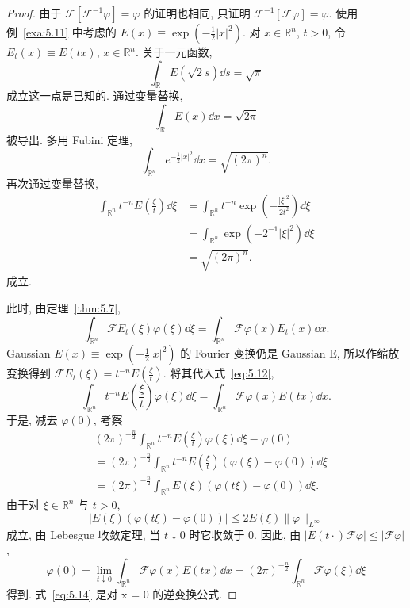 \begin{proof}
由于 $\mathcal{F}[\mathcal{F}^{-1}\varphi] = \varphi$ 的证明也相同, 只证明 $\mathcal{F}^{-1}[\mathcal{F}\varphi] = \varphi$. 使用例~\ref{exa:5.11} 中考虑的 $E(x) \equiv \exp\left(-\frac{1}{2}|x|^{2}\right)$. 对 $x \in \mathbb{R}^{n}$, $t > 0$, 令 $E_{t}(x) \equiv E(tx)$, $x \in \mathbb{R}^{n}$. 关于一元函数,
\[
\int_{\mathbb{R}}E(\sqrt{2}s)\dd s = \sqrt{\pi}
\]
成立这一点是已知的. 通过变量替换,
\[
\int_{\mathbb{R}}E(x)\dd x = \sqrt{2\pi}
\]
被导出. 多用 Fubini 定理,
\[
\int_{\mathbb{R}^{n}}e^{-\frac{1}{2}|x|^{2}}\dd x = \sqrt{(2\pi)^{n}}.
\]
再次通过变量替换,
\begin{align}
\int_{\mathbb{R}^{n}}t^{-n}E\left(\frac{\xi}{t}\right)\dd \xi &= \int_{\mathbb{R}^{n}}t^{-n}\exp\left(-\frac{|\xi|^{2}}{2t^{2}}\right)\dd \xi \nonumber \\
&= \int_{\mathbb{R}^{n}}\exp\left(-2^{-1}|\xi|^{2}\right)\dd \xi \nonumber \\
&= \sqrt{(2\pi)^{n}}. \tag{5.11}
\label{eq:5.11}
\end{align}
成立.

此时, 由定理~\ref{thm:5.7},
\begin{equation}\tag{5.12}
\int_{\mathbb{R}^{n}}\mathcal{F}E_{t}(\xi)\varphi(\xi)\dd \xi = \int_{\mathbb{R}^{n}}\mathcal{F}\varphi(x)E_{t}(x)\dd x.
\label{eq:5.12}
\end{equation}
Gaussian $E(x) \equiv \exp\left(-\frac{1}{2}|x|^{2}\right)$ 的 Fourier 变换仍是 Gaussian E, 所以作缩放变换得到 $\mathcal{F}E_{t}(\xi) = t^{-n}E\left(\frac{\xi}{t}\right)$. 将其代入式~\eqref{eq:5.12},
\begin{equation}\tag{5.13}
\int_{\mathbb{R}^{n}}t^{-n}E\left(\frac{\xi}{t}\right)\varphi(\xi)\dd \xi = \int_{\mathbb{R}^{n}}\mathcal{F}\varphi(x)E(tx)\dd x.
\label{eq:5.13}
\end{equation}
于是, 减去 $\varphi(0)$, 考察
\begin{align*}
&(2\pi)^{-\frac{n}{2}}\int_{\mathbb{R}^{n}}t^{-n}E\left(\frac{\xi}{t}\right)\varphi(\xi)\dd \xi - \varphi(0) \\
&= (2\pi)^{-\frac{n}{2}}\int_{\mathbb{R}^{n}}t^{-n}E\left(\frac{\xi}{t}\right)(\varphi(\xi) - \varphi(0))\dd \xi \\
&= (2\pi)^{-\frac{n}{2}}\int_{\mathbb{R}^{n}}E(\xi)(\varphi(t\xi) - \varphi(0))\dd \xi.
\end{align*}
由于对 $\xi \in \mathbb{R}^{n}$ 与 $t > 0$,
\[
|E(\xi)(\varphi(t\xi) - \varphi(0))| \leq 2E(\xi)\|\varphi\|_{L^{\infty}}
\]
成立, 由 Lebesgue 收敛定理, 当 $t \downarrow 0$ 时它收敛于 0. 因此, 由 $|E(t\cdot)\mathcal{F}\varphi| \leq |\mathcal{F}\varphi|$,
\begin{equation}\tag{5.14}
\varphi(0) = \lim_{t \downarrow 0}\int_{\mathbb{R}^{n}}\mathcal{F}\varphi(x)E(tx)\dd x = (2\pi)^{-\frac{n}{2}}\int_{\mathbb{R}^{n}}\mathcal{F}\varphi(\xi)\dd \xi
\label{eq:5.14}
\end{equation}
得到. 式~\eqref{eq:5.14} 是对 x = 0 的逆变换公式.


\end{proof}
